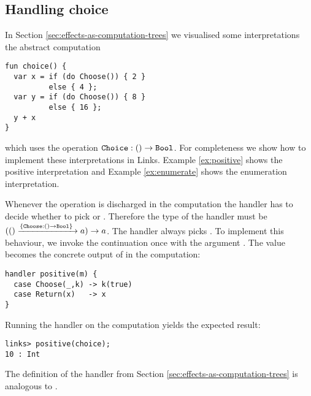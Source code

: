 
\subsection{Handling choice}\label{sec:choice}
In Section \ref{sec:effects-as-computation-trees} we visualised some interpretations the abstract computation
\begin{lstlisting}[style=links]
fun choice() {
  var x = if (do Choose()) { 2 }
          else { 4 };
  var y = if (do Choose()) { 8 }
          else { 16 };
  y + x
}
\end{lstlisting}
which uses the operation $\texttt{Choice} : () \to \texttt{Bool}$. For completeness we show how to implement these interpretations in Links. Example \ref{ex:positive} shows the positive interpretation and Example \ref{ex:enumerate} shows the enumeration interpretation.
\begin{example}\label{ex:positive}
Whenever the operation  is discharged in the computation  the handler has to decide whether to pick  or . Therefore the type of the handler  must be
$(() \xrightarrow{\{\texttt{Choose}:() \to \texttt{Bool}\}\;} a) \to a$.
The  handler always picks . To implement this behaviour, we invoke the continuation once with the argument . The value  becomes the concrete output of  in the computation:
\begin{lstlisting}[style=links]
handler positive(m) {
  case Choose(_,k) -> k(true)
  case Return(x)   -> x
}
\end{lstlisting}
Running the handler on the computation  yields the expected result:
\begin{lstlisting}[style=links]
links> positive(choice);
10 : Int
\end{lstlisting}
The definition of the handler  from Section \ref{sec:effects-as-computation-trees} is analogous to .
\end{example}

